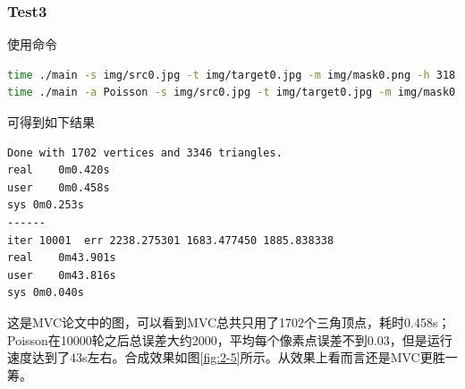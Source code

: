 \documentclass[a4paper]{article}
\begin{document}
\subsubsection{Test3}
使用命令
\begin{lstlisting}[language=bash]
time ./main -s img/src0.jpg -t img/target0.jpg -m img/mask0.png -h 318 -w 370 -o result_MVC.png
time ./main -a Poisson -s img/src0.jpg -t img/target0.jpg -m img/mask0.png -o result_poisson.png -i 10000 -h 350 -w 400
\end{lstlisting}
可得到如下结果
\begin{lstlisting}[language=bash]
Done with 1702 vertices and 3346 triangles.
real	0m0.420s
user	0m0.458s
sys	0m0.253s
------
iter 10001  err 2238.275301 1683.477450 1885.838338
real	0m43.901s
user	0m43.816s
sys	0m0.040s
\end{lstlisting}

这是MVC论文中的图，可以看到MVC总共只用了1702个三角顶点，耗时0.458s；Poisson在10000轮之后总误差大约2000，平均每个像素点误差不到0.03，但是运行速度达到了43s左右。合成效果如图\ref{fig:2-5}所示。从效果上看而言还是MVC更胜一筹。
\end{document}
